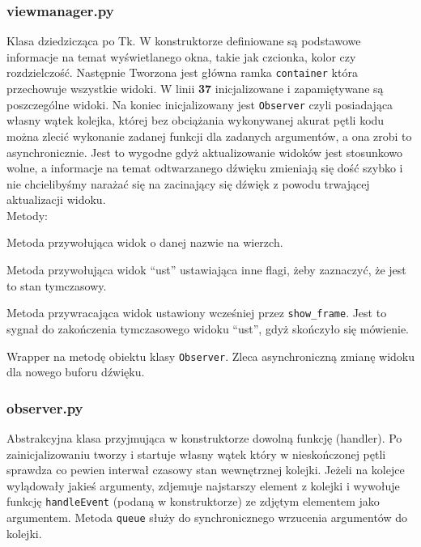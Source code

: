 \documentclass[declaration,shortabstract, inz]{iithesis}
\begin{document}
\subsubsection{view\textunderscore{}manager.py}
% 
    Klasa dziedzicząca po Tk. W konstruktorze definiowane są podstawowe informacje na temat wyświetlanego okna, takie jak czcionka, kolor czy rozdzielczość. Następnie Tworzona jest główna ramka \texttt{container} która przechowuje wszystkie widoki. W linii \textbf{37} inicjalizowane i zapamiętywane są poszczególne widoki. Na koniec inicjalizowany jest \texttt{Observer} czyli posiadająca własny wątek kolejka, której bez obciążania wykonywanej akurat pętli kodu można zlecić wykonanie zadanej funkcji dla zadanych argumentów, a ona zrobi to asynchronicznie. Jest to wygodne gdyż aktualizowanie widoków jest stosunkowo wolne, a informacje na temat odtwarzanego dźwięku zmieniają się dość szybko i nie chcielibyśmy narażać się na zacinający się dźwięk z powodu trwającej aktualizacji widoku. \\
    Metody:
    \begin{description}[style=nextline]
        \item[show\textunderscore{}frame] 
            Metoda przywołująca widok o danej nazwie na wierzch.
        \item[talk\textunderscore{}start]
            Metoda przywołująca widok ``ust'' ustawiająca inne flagi, żeby zaznaczyć, że jest to stan tymczasowy.
        \item[talk\textunderscore{}stop]
            Metoda przywracająca widok ustawiony wcześniej przez \texttt{show_frame}. Jest to sygnał do zakończenia tymczasowego widoku ``ust'', gdyż skończyło się mówienie.
        \item[queue\textunderscore{}audio]
            Wrapper na metodę obiektu klasy \texttt{Observer}. Zleca asynchroniczną zmianę widoku dla nowego buforu dźwięku.
    \end{description}


\subsubsection{observer.py}
% 
    Abstrakcyjna klasa przyjmująca w konstruktorze dowolną funkcję (handler). Po zainicjalizowaniu tworzy i startuje własny wątek który w nieskończonej pętli sprawdza co pewien interwał czasowy stan wewnętrznej kolejki. Jeżeli na kolejce wylądowały jakieś argumenty, zdjemuje najstarszy element z kolejki i wywołuje funkcję \texttt{handleEvent} (podaną w konstruktorze) ze zdjętym elementem jako argumentem.
    Metoda \texttt{queue} służy do synchronicznego wrzucenia argumentów do kolejki.
\end{document}
